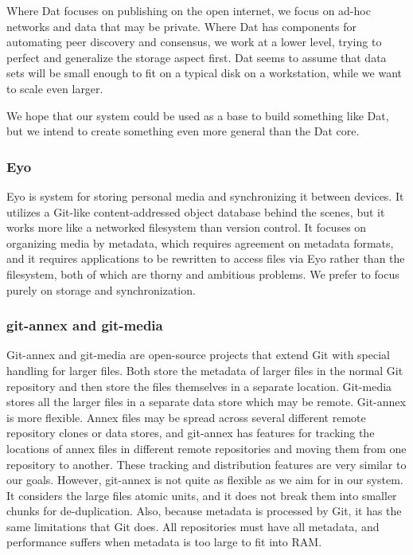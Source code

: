 \documentclass[a4paper]{article}
\begin{document}
Where Dat focuses on publishing on the open internet, we focus on ad-hoc
networks and data that may be private. Where Dat has components for automating
peer discovery and consensus, we work at a lower level, trying to perfect and
generalize the storage aspect first. Dat seems to assume that data sets will be
small enough to fit on a typical disk on a workstation, while we want to scale
even larger.

We hope that our system could be used as a base to build something like Dat, but
we intend to create something even more general than the Dat core.


\subsubsection{Eyo}

Eyo \cite{Strauss:2011:EDP:2002181.2002216} is system for storing personal media
and synchronizing it between devices. It utilizes a Git-like content-addressed
object database behind the scenes, but it works more like a networked filesystem
than version control. It focuses on organizing media by metadata, which requires
agreement on metadata formats, and it requires applications to be rewritten to
access files via Eyo rather than the filesystem, both of which are thorny and
ambitious problems. We prefer to focus purely on storage and synchronization.


\subsubsection{git-annex and git-media}

Git-annex \cite{git_annex_homepage} and git-media \cite{git_media_github} are
open-source projects that extend Git with special handling for larger files.
Both store the metadata of larger files in the normal Git repository and then
store the files themselves in a separate location. Git-media stores all the
larger files in a separate data store which may be remote. Git-annex is more
flexible. Annex files may be spread across several different remote repository
clones or data stores, and git-annex has features for tracking the locations of
annex files in different remote repositories and moving them from one repository
to another. These tracking and distribution features are very similar to our
goals. However, git-annex is not quite as flexible as we aim for in our system.
It considers the large files atomic units, and it does not break them into
smaller chunks for de-duplication. Also, because metadata is processed by Git,
it has the same limitations that Git does. All repositories must have all
metadata, and performance suffers when metadata is too large to fit into RAM.
\end{document}
